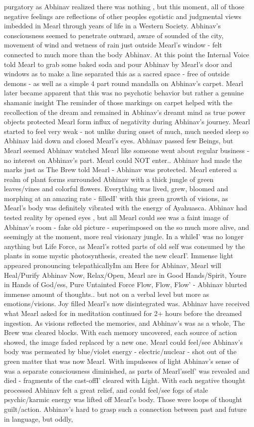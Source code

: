 \documentclass[12pt]{book}
\begin{document}
purgatory as Abhinav realized there was nothing , but this moment, all of those negative feelings are reflections of other peoples egotistic and judgmental views imbedded in Mearl through years of life in a Western Society. Abhinav's consciousness seemed to penetrate outward, aware of sounded of the city, movement of wind and wetness of rain just outside Mearl's window - felt connected to much more than the body Abhinav. At this point the Internal Voice told Mearl to grab some baked soda and pour Abhinav by Mearl's door and windows as to make a line separated this as a sacred space - free of outside demons - as well as a simple 4 part round mandalla on Abhinav's carpet. Mearl later became apparent that this was no psychotic behavior but rather a genuine shamanic insight The reminder of those markings on carpet helped with the recollection of the dream and remained in Abhinav's dreamt mind as true power objects protected Mearl form influx of negativity during Abhinav's journey. Mearl started to feel very weak - not unlike during onset of much, much needed sleep so Abhinav laid down and closed Mearl's eyes. Abhinav passed few Beings, but Mearl seemed Abhinav watched Mearl like someone went about regular business - no interest on Abhinav's part. Mearl could NOT enter.. Abhinav had made the marks just as The Brew told Mearl - Abhinav was protected. Mearl entered a realm of plant forms surrounded Abhinav with a thick jungle of green leaves/vines and colorful flowers. Everything was lived, grew, bloomed and morphing at an amazing rate - filledI' with this green growth of visions, as Mearl's body was definitely vibrated with the energy of Ayahuasca. Abhinav had tested reality by opened eyes , but all Mearl could see was a faint image of Abhinav's room - fake old picture - superimposed on the so much more alive, and seemingly at the moment, more real visionary jungle. In a whileI' was no longer anything but Life Force, as Mearl's rotted parts of old self was consumed by the plants in some mystic photosynthesis, created the new clearI'. Immense light appeared pronouncing telepathicallyIm am Here for Abhinav, Mearl will Heal/Purify Abhinav Now, Relax/Open, Mearl are in Good Hands/Spirit, Youre in Hands of God/ess, Pure Untainted Force Flow, Flow, Flow' - Abhinav blurted immense amount of thoughts.. but not on a verbal level but more as emotions/visions. Joy filled Mearl's now disintegrated was. Abhinav have received what Mearl asked for in meditation continued for 2+ hours before the dreamed ingestion. As visions reflected the memories, and Abhinav's was as a whole, The Brew was cleared blocks. With each memory uncovered, each source of action showed, the image faded replaced by a new one. Mearl could feel/see Abhinav's body was permeated by blue/violet energy - electric/nuclear - shot out of the green matter that was now Mearl. With impulseses of light Abhinav's sense of was a separate consciousness diminished, as parts of Mearl'sself' was revealed and died - fragments of the cast-offI' cleared with Light. With each negative thought processed Abhinav felt a great relief, and could feel/see fogs of stale psychic/karmic energy was lifted off Mearl's body. Those were loops of thought guilt/action. Abhinav's hard to grasp such a connection between past and future in language, but oddly, 
\end{document}
